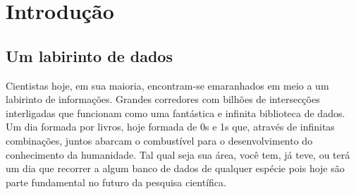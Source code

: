 


\chapter{Introdução}
\label{sec:Intro}


\section{Um labirinto de dados}
\label{sec:Intro:LabData}

Cientistas hoje, em sua maioria, encontram-se emaranhados em meio a um labirinto de informações. Grandes corredores com
bilhões de intersecções interligadas que funcionam como uma fantástica e infinita biblioteca de dados. Um dia formada
por livros, hoje formada de 0s e 1s que, através de infinitas combinações, juntos abarcam o combustível para o
desenvolvimento do conhecimento da humanidade. Tal qual seja sua área, você tem, já teve, ou terá um dia que recorrer a
algum banco de dados de qualquer espécie pois hoje são parte fundamental no futuro da pesquisa científica.


